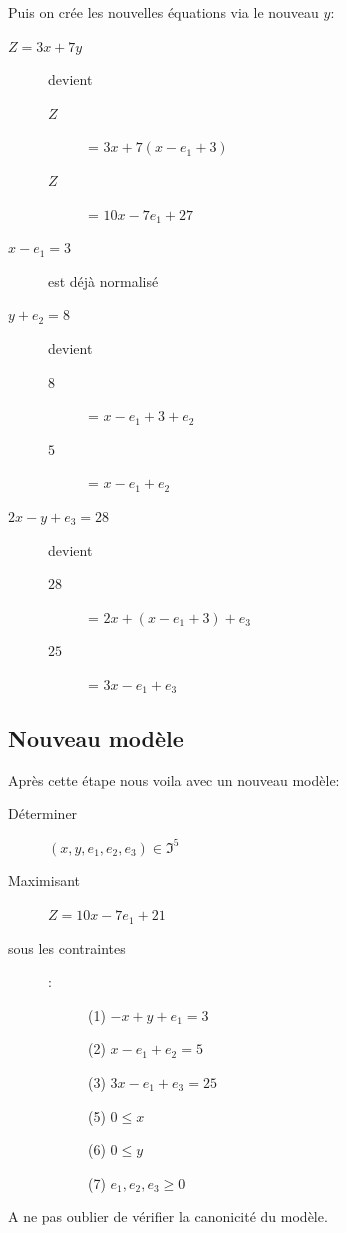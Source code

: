 Puis on crée les nouvelles équations via le nouveau $y$:
\begin{description}
\item[$Z = 3x + 7y$] devient
\begin{description}
\item[$Z$] = $3x + 7(x - e_1 + 3)$
\item[$Z$] = $10x - 7e_1 + 27$
\end{description}
\item[$x - e_1 = 3$] est déjà normalisé
\item[$y + e_2 = 8$] devient
\begin{description}
\item[$8$] = $x -e_1 + 3 + e_2$
\item[$5$] = $x - e_1 + e_2$
\end{description}
\item[$2x - y + e_3 = 28$] devient
\begin{description}
\item[$28$] = $2x + (x - e_1 + 3) + e_3$
\item[$25$] = $3x - e_1 + e_3$
\end{description}
\end{description}
\pagebreak
\subsection{Nouveau modèle}
Après cette étape nous voila avec un nouveau modèle:
\begin{description}
\item[Déterminer] $(x,y,e_1,e_2,e_3) \in \Im^5$
\item[Maximisant] $Z = 10x - 7e_1 + 21$
\item[sous les contraintes]:
\begin{description}
\item[] (1) $-x + y + e_1 = 3$
\item[] (2) $x - e_1 + e_2 = 5$
\item[] (3) $3x - e_1 + e_3 = 25$
\item[] (5) $ 0 \leq x$
\item[] (6) $ 0 \leq y$
\item[] (7) $ e_1,e_2,e_3 \geq 0$
\end{description}
\end{description}

A ne pas oublier de vérifier la canonicité du modèle.\\

\pagebreak